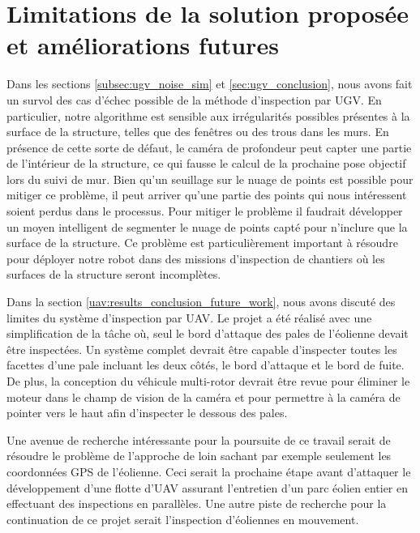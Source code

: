 \section{Limitations de la solution proposée et améliorations futures}\label{sec:Limitations}

Dans les sections \ref{subsec:ugv_noise_sim} et \ref{sec:ugv_conclusion}, nous avons fait un survol des cas d'échec possible de la méthode d'inspection par UGV. En particulier, notre algorithme est sensible aux irrégularités possibles présentes à la surface de la structure, telles que des fenêtres ou des trous dans les murs. En présence de cette sorte de défaut, le caméra de profondeur peut capter une partie de l'intérieur de la structure, ce qui fausse le calcul de la prochaine pose objectif lors du suivi de mur. Bien qu'un seuillage sur le nuage de points est possible pour mitiger ce problème, il peut arriver qu'une partie des points qui nous intéressent soient perdus dans le processus. Pour mitiger le problème il faudrait développer un moyen intelligent de segmenter le nuage de points capté pour n'inclure que la surface de la structure. Ce problème est particulièrement important à résoudre pour déployer notre robot dans des missions d'inspection de chantiers où les surfaces de la structure seront incomplètes. 

Dans la section \ref{uav:results_conclusion_future_work}, nous avons discuté des limites du système d'inspection par UAV. Le projet a été réalisé avec une simplification de la tâche où, seul le bord d'attaque des pales de l'éolienne devait être inspectées. Un système complet devrait être capable d'inspecter toutes les facettes d'une pale incluant les deux côtés, le bord d'attaque et le bord de fuite. De plus, la conception du véhicule multi-rotor devrait être revue pour éliminer le moteur dans le champ de vision de la caméra et pour permettre à la caméra de pointer vers le haut afin d'inspecter le dessous des pales. 

Une avenue de recherche intéressante pour la poursuite de ce travail serait de résoudre le problème de l'approche de loin sachant par exemple seulement les coordonnées GPS de l'éolienne. Ceci serait la prochaine étape avant d'attaquer le développement d'une flotte d'UAV assurant l'entretien d'un parc éolien entier en effectuant des inspections en parallèles. Une autre piste de recherche pour la continuation de ce projet serait l'inspection d'éoliennes en mouvement.

